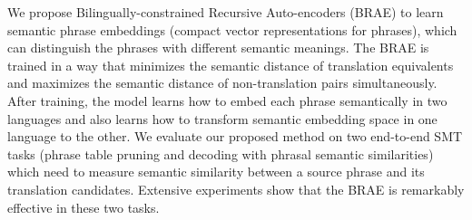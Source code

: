 We propose Bilingually-constrained Recursive Auto-encoders (BRAE) to learn semantic phrase embeddings (compact vector representations for phrases), which can distinguish the phrases with different semantic meanings. The BRAE is trained in a way that minimizes the semantic distance of translation equivalents and maximizes the semantic distance of non-translation pairs simultaneously. After training, the model learns how to embed each phrase semantically in two languages and also learns how to transform semantic embedding space in one language to the other. We evaluate our proposed method on two end-to-end SMT tasks (phrase table pruning and decoding with phrasal semantic similarities) which need to measure semantic similarity between a source phrase and its translation candidates. Extensive experiments show that the BRAE is remarkably effective in these two tasks.
